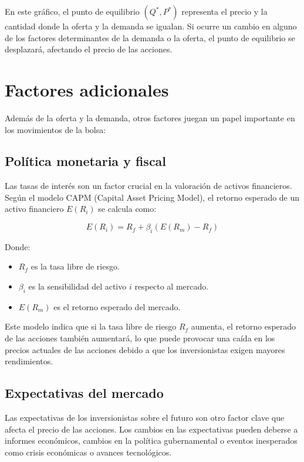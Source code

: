 En este gráfico, el punto de equilibrio $(Q^*, P^*)$ representa el precio y la cantidad donde la oferta y la demanda se igualan. Si ocurre un cambio en alguno de los factores determinantes de la demanda o la oferta, el punto de equilibrio se desplazará, afectando el precio de las acciones.

\section{Factores adicionales}

Además de la oferta y la demanda, otros factores juegan un papel importante en los movimientos de la bolsa:

\subsection{Política monetaria y fiscal}
Las tasas de interés son un factor crucial en la valoración de activos financieros. Según el modelo CAPM (Capital Asset Pricing Model), el retorno esperado de un activo financiero \( E(R_i) \) se calcula como:

\begin{equation}
E(R_i) = R_f + \beta_i (E(R_m) - R_f)
\end{equation}

Donde:
\begin{itemize}
\item \(R_f\) es la tasa libre de riesgo.
\item \(\beta_i\) es la sensibilidad del activo \(i\) respecto al mercado.
\item \(E(R_m)\) es el retorno esperado del mercado.
\end{itemize}

Este modelo indica que si la tasa libre de riesgo \(R_f\) aumenta, el retorno esperado de las acciones también aumentará, lo que puede provocar una caída en los precios actuales de las acciones debido a que los inversionistas exigen mayores rendimientos.

\subsection{Expectativas del mercado}

Las expectativas de los inversionistas sobre el futuro son otro factor clave que afecta el precio de las acciones. Los cambios en las expectativas pueden deberse a informes económicos, cambios en la política gubernamental o eventos inesperados como crisis económicas o avances tecnológicos.

